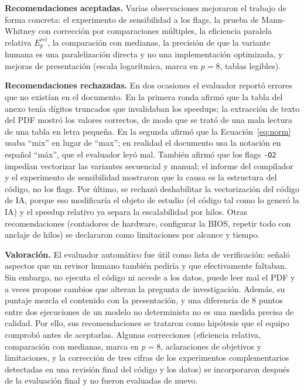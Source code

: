 \documentclass[12pt]{article}
\begin{document}
\textbf{Recomendaciones aceptadas.} Varias observaciones mejoraron el trabajo de forma concreta: el experimento de sensibilidad a los flags, la prueba de Mann-Whitney con corrección por comparaciones múltiples, la eficiencia paralela relativa $E^{rel}_p$, la comparación con medianas, la precisión de que la variante humana es una paralelización directa y no una implementación optimizada, y mejoras de presentación (escala logarítmica, marca en $p = 8$, tablas legibles).

\textbf{Recomendaciones rechazadas.} En dos ocasiones el evaluador reportó errores que no existían en el documento. En la primera ronda afirmó que la tabla del anexo tenía dígitos truncados que invalidaban los speedups; la extracción de texto del PDF mostró los valores correctos, de modo que se trató de una mala lectura de una tabla en letra pequeña. En la segunda afirmó que la Ecuación~\ref{eq:norm} usaba ``mix'' en lugar de ``max''; en realidad el documento usa la notación en español ``máx'', que el evaluador leyó mal. También afirmó que los flags \texttt{-O2} impedían vectorizar las variantes secuencial y manual; el informe del compilador y el experimento de sensibilidad mostraron que la causa es la estructura del código, no los flags. Por último, se rechazó deshabilitar la vectorización del código de IA, porque eso modificaría el objeto de estudio (el código tal como lo generó la IA) y el speedup relativo ya separa la escalabilidad por hilos. Otras recomendaciones (contadores de hardware, configurar la BIOS, repetir todo con anclaje de hilos) se declararon como limitaciones por alcance y tiempo.

\textbf{Valoración.} El evaluador automático fue útil como lista de verificación: señaló aspectos que un revisor humano también pediría y que efectivamente faltaban. Sin embargo, no ejecuta el código ni accede a los datos, puede leer mal el PDF y a veces propone cambios que alteran la pregunta de investigación. Además, su puntaje mezcla el contenido con la presentación, y una diferencia de 8 puntos entre dos ejecuciones de un modelo no determinista no es una medida precisa de calidad. Por ello, sus recomendaciones se trataron como hipótesis que el equipo comprobó antes de aceptarlas. Algunas correcciones (eficiencia relativa, comparación con medianas, marca en $p = 8$, aclaraciones de objetivos y limitaciones, y la corrección de tres cifras de los experimentos complementarios detectadas en una revisión final del código y los datos) se incorporaron después de la evaluación final y no fueron evaluadas de nuevo.
\end{document}
